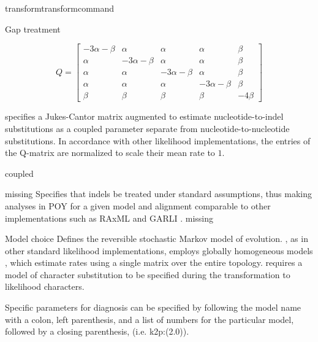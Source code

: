 \begin{command}{transform}{transformcommand}
\begin{arguments}
\begin {argumentgroup} {Gap treatment}
{                \begin{equation*}
                    Q =
                        \begin{bmatrix}
                            -3 \alpha - \beta & \alpha & \alpha & \alpha & \beta \\
                            \alpha & -3 \alpha - \beta & \alpha & \alpha & \beta \\
                            \alpha & \alpha & -3 \alpha - \beta & \alpha & \beta \\
                            \alpha & \alpha & \alpha & -3 \alpha - \beta & \beta \\
                            \beta & \beta & \beta & \beta & -4 \beta
                    \end{bmatrix}
                \end{equation*}

                specifies a Jukes-Cantor matrix augmented to
                estimate nucleotide-to-indel substitutions as a
                coupled parameter separate from
                nucleotide-to-nucleotide substitutions. In
                accordance with other likelihood implementations,
                the entries of the Q-matrix are normalized
                to scale their mean rate to $ 1 $.}
                {coupled}
                
             {\obligatory missing}
                {Specifies that indels be treated under standard
                assumptions, thus making analyses in POY for a given
                model and alignment comparable to other
                implementations such as RAxML \cite{stamatakis2006} and 
                GARLI \cite{zwickl2006}.}
                {missing}

        \end {argumentgroup}                         
      

        \begin {argumentgroup} {Model choice}
            Defines the reversible stochastic Markov model of evolution.
            \poy, as in other standard likelihood implementations,
            employs globally homogeneous models \cite{jayaswal2005estimation}, which
            estimate rates using a single matrix over the entire topology.
            \poy requires a model of character substitution to be specified
            during the transformation to likelihood characters.

            Specific parameters for diagnosis can be specified by following
            the model name with a colon, left parenthesis, and a list of
            numbers for the particular model, followed by a closing
            parenthesis, (i.e. k2p:(2.0)).


\end{argumentgroup}
\end{arguments}
\end{command}
